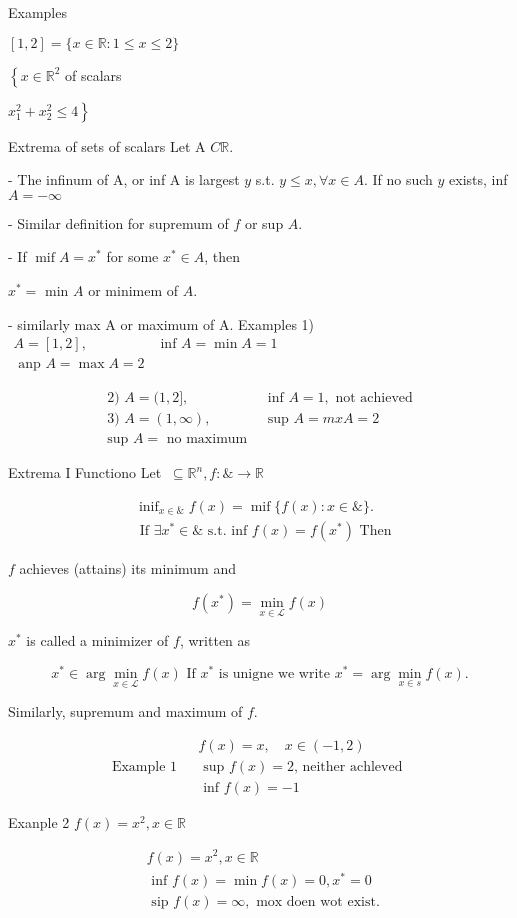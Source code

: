 \documentclass[11pt,a4paper]{article}
\begin{document}
Examples

$[1,2]=\{x \in \mathbb{R}: 1 \leqslant x \leqslant 2\}$

$\left\{x \in \mathbb{R}^{2}\right.$
of scalars

$\left.x_{1}^{2}+x_{2}^{2} \leqslant 4\right\}$

Extrema of sets of scalars Let A $C \mathbb{R}$.

- The infinum of A, or inf A is largest $y$ s.t. $y \leqslant x, \forall x \in A$. If no such $y$ exists, inf $A=-\infty$

- Similar definition for supremum of $f$ or sup $A$.

- If $\operatorname{mif} A=x^{*}$ for some $x^{*} \in A$, then

$x^{*}=$ min $A$ or minimem of $A$.

- similarly max A or maximum of A. Examples 1) $\begin{aligned} A=[1,2], & \text { inf } A=\min A=1 \\ \text { anp } A=\max A=2 \end{aligned}$

$$
\begin{array}{ll}
\text { 2) } A=(1,2], & \text { inf } A=1, \text { not achieved } \\
\text { 3) } A=(1, \infty), & \text { sup } A=m x A=2 \\
\text { sup } A=\text { no maximum } &
\end{array}
$$

Extrema I Functiono Let $\ \subseteq \mathbb{R}^{n}, f: \& \rightarrow \mathbb{R}$

$$
\begin{aligned}
&\operatorname{inif}_{x \in \&} f(x)=\operatorname{mif}\{f(x): x \in \&\} . \\
&\text { If } \exists x^{*} \in \& \text { s.t. inf } f(x)=f\left(x^{*}\right) \text { Then }
\end{aligned}
$$

$f$ achieves (attains) its minimum and

$$
f\left(x^{*}\right)=\min _{x \in \mathcal{L}} f(x)
$$

$x^{*}$ is called a minimizer of $f$, written as

$$
x^{*} \in \arg \min _{x \in \mathcal{L}} f(x) {\text { If } x^{*} \text { is unigne we write } x^{*}=\arg \min _{x \in s} f(x).}
$$

Similarly, supremum and maximum of $f$.

$$
\text { Example 1 } \begin{aligned}
& f(x)=x, \quad x \in(-1,2) \\
& \text { sup } f(x)=2 \text {, neither achleved } \\
& \text { inf } f(x)=-1
\end{aligned}
$$

Exanple 2 $f(x)=x^{2}, x \in \mathbb{R}$

$$
\begin{aligned}
&f(x)=x^{2}, x \in \mathbb{R} \\
&\text { inf } f(x)=\min f(x)=0, x^{*}=0 \\
&\text { sip } f(x)=\infty, \text { mox doen wot exist. }
\end{aligned}
$$
\end{document}
